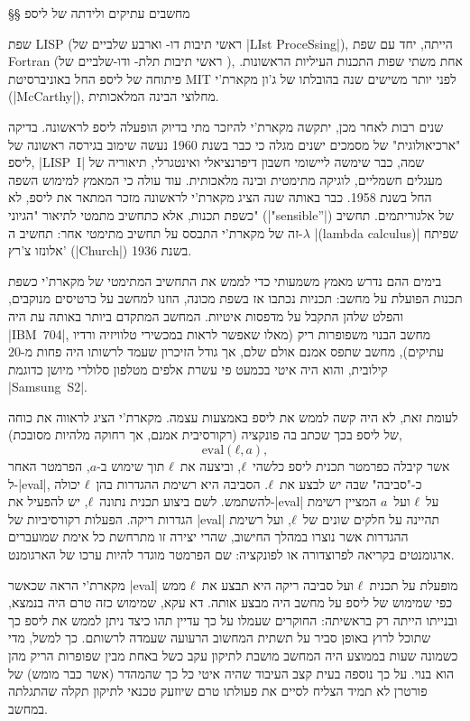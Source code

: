 §§ מחשבים עתיקים ולידתה של ליספ

שפת LISP (ראשי תיבות דו- וארבע שלביים של \E|LIst ProceSsing|), הייתה, יחד עם
שפת Fortran (ראשי תיבות תלת- ודו-שלביים של ), אחת משתי
שפות התכנות העיליות הראשונות. פיתוחה של ליספ החל באוניברסיטת MIT לפני יותר
משישים שנה בהובלתו של ג'ון מקארת'י (\E|McCarthy|), מחלוצי הבינה המלאכותית.

שנים רבות לאחר מכן, יתקשה מקארת'י להיזכר מתי בדיוק הופעלה ליספ לראשונה.
בדיקה "ארכיאולוגית" של מסמכים ישנים מגלה כי כבר בשנת 1960 נעשה שימוב בגירסה
ראשונה של ליספ, \E|LISP~I| שמה, כבר שימשה ליישומי חשבון דיפרנציאלי ואינטגרלי,
תיאוריה של מעגלים חשמליים, לוגיקה מתימטית ובינה מלאכותית. עוד עולה כי המאמץ
למימוש השפה החל בשנת 1958. כבר באותה שנה הציג מקארת'י לראשונה מזכר המתאר את
ליספ, לא כשפת תכנות, אלא כתחשיב מתמטי לתיאור "הגיוני" (\E|"sensible”|) של
אלגוריתמים. תחשיב זה של מקארת'י התבסס על תחשיב מתימטי אחר: תחשיב ה-$λ$
\E|(lambda calculus)| שפיתח אלונזו צ'רץ' (\E|Church|) בשנת 1936.

בימים ההם נדרש מאמץ משמעותי כדי לממש את התחשיב המתימטי של מקארת'י כשפת תכנות
הפועלת על מחשב: תכניות נכתבו אז בשפת מכונה, הוזנו למחשב על כרטיסים מנוקבים,
והפלט שלהן התקבל על מדפסות איטיות. המחשב המתקדם ביותר באותה עת היה \E|IBM~704|,
מחשב הבנוי משפופרות ריק (מאלו שאפשר לראות במכשירי טלוויזיה ורדיו עתיקים), מחשב
שתפס אמנם אולם שלם, אך גודל הזיכרון שעמד לרשותו היה פחות מ-20 קילובית, והוא היה
איטי בכמעט פי עשרת אלפים מטלפון סלולרי מיושן כדוגמת \E|Samsung~S2|.

לעומת זאת, לא היה קשה לממש את ליספ באמצעות עצמה. מקארת'י הציג לראווה את כוחה
של ליספ בכך שכתב בה פונקציה (רקורסיבית אמנם, אך רחוקה מלהיות מסובכת),
\begin{equation} \label{eq:eval}
  \text{eval}(ℓ, a),
\end{equation}
אשר קיבלה כפרמטר תכנית ליספ כלשהי~$ℓ$, וביצעה את~$ℓ$ תוך שימוש ב-$a$, הפרמטר
האחר ל-\E|eval|, כ-"סביבה" שבה יש לבצע את~$ℓ$. הסביבה היא רשימת ההגדרות בהן~$ℓ$
יכולה להשתמש. לשם ביצוע תכנית נתונה~$ℓ$, יש להפעיל את-\E|eval| על~$ℓ$
ועל~$a$ המציין רשימת הגדרות ריקה. הפעלות רקורסיביות של \E|eval| תהיינה על חלקים
שונים של~$ℓ$, ועל רשימת ההגדרות אשר נוצרו במהלך החישוב, שהרי יצירה זו מתרחשת כל
אימת שמועברים ארגומנטים בקריאה לפרוצדורה או לפונקציה: שם הפרמטר מוגדר להיות
ערכו של הארגומנט.

מקארת'י הראה שכאשר \E|eval| מופעלת על תכנית~$ℓ$ ועל סביבה ריקה היא
תבצע את~$ℓ$ ממש כפי שמימוש של ליספ על מחשב היה מבצע אותה. דא עקא, שמימוש כזה
טרם היה בנמצא, ובנייתו הייתה רק בראשיתה: החוקרים שעמלו על כך עדיין תהו
כיצד ניתן לממש את ליספ כך שתוכל לרוץ באופן סביר על תשתית המחשוב הרעועה שעמדה
לרשותם. כך למשל, מדי כשמונה שעות בממוצע היה המחשב מושבת לתיקון עקב כשל באחת
מבין שפופרות הריק מהן הוא בנוי. על כך נוספה בעית קצב העיבוד שהיה איטי כל כך
שהמהדר (אשר כבר מומש) של פורטרן לא תמיד הצליח לסיים את פעולתו טרם שיוזעק טכנאי
לתיקון תקלה שהתגלתה במחשב.

